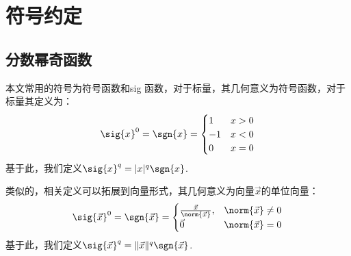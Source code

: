 \section{符号约定}

\subsection{分数幂奇函数}
本文常用的符号为符号函数和sig 函数，对于标量，其几何意义为符号函数，对于标量其定义为：
\begin{equation}
    \sig{x}^0=\sgn{x}=\begin{cases}
    	1   & x>0\\
    	-1 & x<0\\
    	0  & x=0\\
    \end{cases}
\end{equation}
基于此，我们定义$\sig{x}^q=|x|^q \sgn{x}$.

类似的，相关定义可以拓展到向量形式，其几何意义为向量$\vec{x}$的单位向量：
\begin{equation}
	\sig{\vec{x}}^0=\sgn{\vec{x}}=\begin{cases}
		\frac{\vec{x}}{\norm{\vec{x}}}, & \norm{\vec{x}}\neq 0\\
		\vec{0}   & \norm{\vec{x}}=0
	\end{cases}
\end{equation}
基于此，我们定义$\sig{\vec{x}}^q=\|\vec{x}\|^q \sgn{\vec{x}}$.